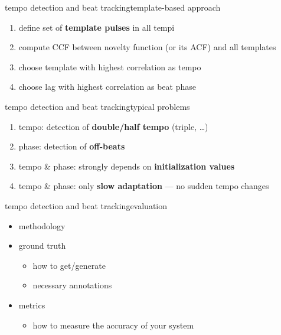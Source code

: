         \begin{frame}{tempo detection and beat tracking}{template-based approach}
            \begin{enumerate}
                \item	define set of \textbf{template pulses} in all tempi
                \item<2->	compute CCF between novelty function (or its ACF) and all templates
                \item<3->	choose template with highest correlation as tempo
                \item<4->	choose lag with highest correlation as beat phase
            \end{enumerate}
        \end{frame}
        \begin{frame}{tempo detection and beat tracking}{typical problems}
            \begin{enumerate}
                \item	tempo: detection of \textbf{double/half tempo} (triple, \ldots)
                \smallskip
                \item<2->	phase: detection of \textbf{off-beats}
                \smallskip
                \item<3->	tempo \& phase: strongly depends on \textbf{initialization values}
                \smallskip
                \item<4->	tempo \& phase: only \textbf{slow adaptation} --- no sudden tempo changes
                
            \end{enumerate}
        \end{frame}
        \begin{frame}{tempo detection and beat tracking}{evaluation}
            \begin{itemize}
                \item   methodology
                \item   ground truth
                    \begin{itemize}
                        \item   how to get/generate
                        \item   necessary annotations
                    \end{itemize}
                \item   metrics
                    \begin{itemize}
                        \item   how to measure the accuracy of your system
                    \end{itemize}
            \end{itemize}
        \end{frame}

